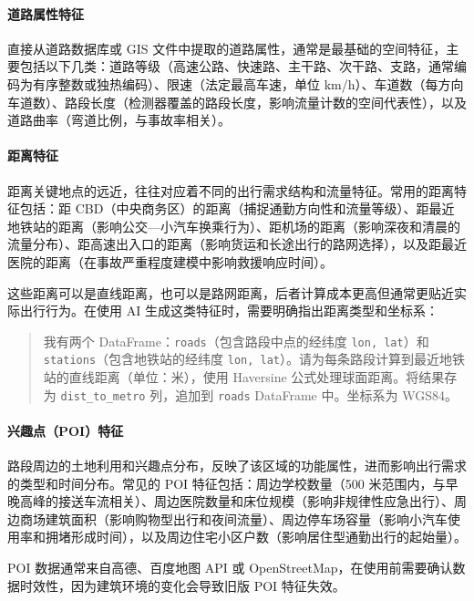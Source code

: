 \paragraph{道路属性特征}

直接从道路数据库或 GIS 文件中提取的道路属性，通常是最基础的空间特征，主要包括以下几类：道路等级（高速公路、快速路、主干路、次干路、支路，通常编码为有序整数或独热编码）、限速（法定最高车速，单位 km/h）、车道数（每方向车道数）、路段长度（检测器覆盖的路段长度，影响流量计数的空间代表性），以及道路曲率（弯道比例，与事故率相关）。

\paragraph{距离特征}

距离关键地点的远近，往往对应着不同的出行需求结构和流量特征。常用的距离特征包括：距 CBD（中央商务区）的距离（捕捉通勤方向性和流量等级）、距最近地铁站的距离（影响公交—小汽车换乘行为）、距机场的距离（影响深夜和清晨的流量分布）、距高速出入口的距离（影响货运和长途出行的路网选择），以及距最近医院的距离（在事故严重程度建模中影响救援响应时间）。

这些距离可以是直线距离，也可以是路网距离，后者计算成本更高但通常更贴近实际出行行为。在使用 AI 生成这类特征时，需要明确指出距离类型和坐标系：

\begin{quote}
我有两个 DataFrame：\texttt{roads}（包含路段中点的经纬度 \texttt{lon, lat}）和 \texttt{stations}（包含地铁站的经纬度 \texttt{lon, lat}）。请为每条路段计算到最近地铁站的直线距离（单位：米），使用 Haversine 公式处理球面距离。将结果存为 \texttt{dist\_to\_metro} 列，追加到 \texttt{roads} DataFrame 中。坐标系为 WGS84。
\end{quote}

\paragraph{兴趣点（POI）特征}

路段周边的土地利用和兴趣点分布，反映了该区域的功能属性，进而影响出行需求的类型和时间分布。常见的 POI 特征包括：周边学校数量（500 米范围内，与早晚高峰的接送车流相关）、周边医院数量和床位规模（影响非规律性应急出行）、周边商场建筑面积（影响购物型出行和夜间流量）、周边停车场容量（影响小汽车使用率和拥堵形成时间），以及周边住宅小区户数（影响居住型通勤出行的起始量）。

POI 数据通常来自高德、百度地图 API 或 OpenStreetMap，在使用前需要确认数据时效性，因为建筑环境的变化会导致旧版 POI 特征失效。

